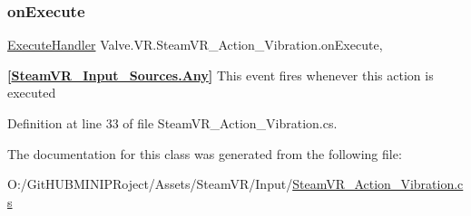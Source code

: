 \mbox{\label{class_valve_1_1_v_r_1_1_steam_v_r___action___vibration_a01bd50ca9598959946e12dc9a22bd05d}} 
\subsubsection{\texorpdfstring{onExecute}{onExecute}}
{\footnotesize\ttfamily \mbox{\hyperlink{class_valve_1_1_v_r_1_1_steam_v_r___action___vibration_ac075e9e8f3e9eea89be32c403e6f86d5}{Execute\+Handler}} Valve.\+V\+R.\+Steam\+V\+R\+\_\+\+Action\+\_\+\+Vibration.\+on\+Execute\hspace{0.3cm}{\ttfamily [add]}, {\ttfamily [remove]}}



{\bfseries{\mbox{[}\mbox{\hyperlink{namespace_valve_1_1_v_r_a82e5bf501cc3aa155444ee3f0662853faed36a1ef76a59ee3f15180e0441188ad}{Steam\+V\+R\+\_\+\+Input\+\_\+\+Sources.\+Any}}\mbox{]}}} This event fires whenever this action is executed 



Definition at line 33 of file Steam\+V\+R\+\_\+\+Action\+\_\+\+Vibration.\+cs.



The documentation for this class was generated from the following file\+:\begin{DoxyCompactItemize}
\item 
O\+:/\+Git\+H\+U\+B\+M\+I\+N\+I\+P\+Roject/\+Assets/\+Steam\+V\+R/\+Input/\mbox{\hyperlink{_steam_v_r___action___vibration_8cs}{Steam\+V\+R\+\_\+\+Action\+\_\+\+Vibration.\+cs}}\end{DoxyCompactItemize}
